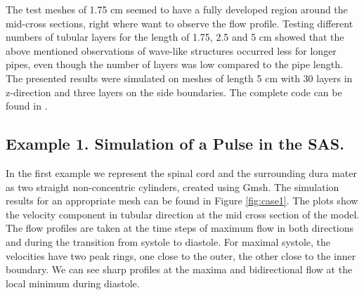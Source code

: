 %


The test meshes of 1.75 cm seemed to have a fully developed region around the mid-cross sections, right where want to observe the flow profile. Testing different numbers of tubular layers for the length of 1.75, 2.5 and 5 cm showed that the above mentioned observations of wave-like structures occurred less for longer pipes, even though the number of layers was low compared to the pipe length.
The presented results were simulated on meshes of length 5 cm with 30 layers in z-direction and three layers on the side boundaries. The complete code can be found in .





\subsection{Example 1. Simulation of a Pulse in the SAS.}
In the first example we represent the spinal cord and the surrounding dura mater as two straight non-concentric cylinders, created using Gmsh. 
The simulation results for an appropriate mesh can be found in Figure \ref{fig:case1}. The plots show the velocity component in tubular direction at the mid cross section of the model. The flow profiles are taken at the time steps of maximum flow in both directions and during the transition from systole to diastole. For maximal systole, the velocities have two peak rings, one close to the outer, the other close to the inner boundary. We can see sharp profiles at the maxima and bidirectional flow at the local minimum during diastole.



